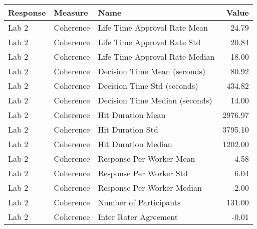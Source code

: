 \begin{tabular}{lllr}
\toprule
Response & Measure & Name & Value \\
\midrule
Lab 2 & Coherence & Life Time Approval Rate Mean & 24.79 \\
Lab 2 & Coherence & Life Time Approval Rate Std & 20.84 \\
Lab 2 & Coherence & Life Time Approval Rate Median & 18.00 \\
Lab 2 & Coherence & Decision Time Mean (seconds) & 80.92 \\
Lab 2 & Coherence & Decision Time Std (seconds) & 434.82 \\
Lab 2 & Coherence & Decision Time Median (seconds) & 14.00 \\
Lab 2 & Coherence & Hit Duration Mean & 2976.97 \\
Lab 2 & Coherence & Hit Duration Std & 3795.10 \\
Lab 2 & Coherence & Hit Duration Median & 1202.00 \\
Lab 2 & Coherence & Response Per Worker Mean & 4.58 \\
Lab 2 & Coherence & Response Per Worker Std & 6.04 \\
Lab 2 & Coherence & Response Per Worker Median & 2.00 \\
Lab 2 & Coherence & Number of Participants & 131.00 \\
Lab 2 & Coherence & Inter Rater Agreement & -0.01 \\
\bottomrule
\end{tabular}
